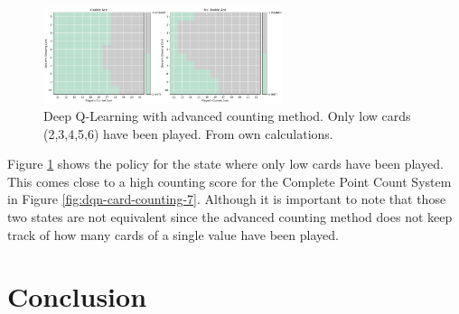 \documentclass[conference]{IEEEtran}
\begin{document}
\begin{figure}
	\centering
	\includegraphics[width=70mm]{figures/DQN/advanced/policy-low-cards-played.png}
	\caption{Deep Q-Learning with advanced counting method. Only low cards (2,3,4,5,6) have been played. From own calculations.}
	\label{fig:dqn-advanced-only-low}
\end{figure}

Figure \ref{fig:dqn-advanced-only-low} shows the policy for the state where only low cards have been played. 
This comes close to a high counting score for the Complete Point Count System in Figure \ref{fig:dqn-card-counting-7}.
Although it is important to note that those two states are not equivalent since the advanced counting method does not keep track of how many cards of a single value have been played.










\section{Conclusion}
\end{document}
